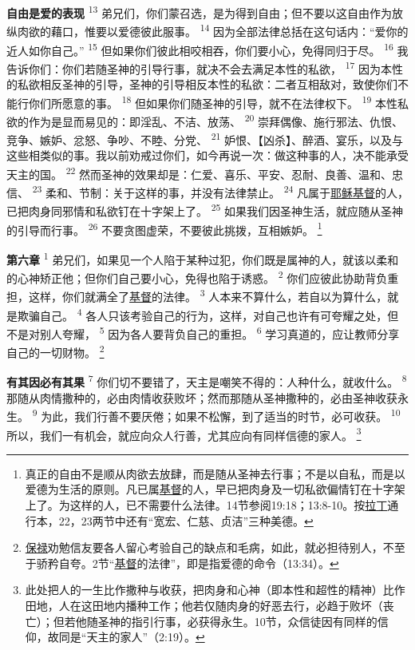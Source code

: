 \textbf{自由是爱的表现\quad}
\textsuperscript{13}
弟兄们，你们蒙召选，是为得到自由；但不要以这自由作为放纵肉欲的藉口，惟要以爱德彼此服事。
\textsuperscript{14}
因为全部法律总括在这句话内：“爱你的近人如你自己。”
\textsuperscript{15}
但如果你们彼此相咬相吞，你们要小心，免得同归于尽。
\textsuperscript{16}
我告诉你们：你们若随圣神的引导行事，就决不会去满足本性的私欲，
\textsuperscript{17}
因为本性的私欲相反圣神的引导，圣神的引导相反本性的私欲：二者互相敌对，致使你们不能行你们所愿意的事。
\textsuperscript{18}
但如果你们随圣神的引导，就不在法律权下。
\textsuperscript{19}
本性私欲的作为是显而易见的：即淫乱、不洁、放荡、
\textsuperscript{20}
崇拜偶像、施行邪法、仇恨、竞争、嫉妒、忿怒、争吵、不睦、分党、
\textsuperscript{21}
妒恨、【凶杀】、醉酒、宴乐，以及与这些相类似的事。我以前劝戒过你们，如今再说一次：做这种事的人，决不能承受天主的国。
\textsuperscript{22}
然而圣神的效果却是：仁爱、喜乐、平安、忍耐、良善、温和、忠信、
\textsuperscript{23}
柔和、节制：关于这样的事，并没有法律禁止。
\textsuperscript{24}
凡属于\uline{耶稣}\uline{基督}的人，已把肉身同邪情和私欲钉在十字架上了。
\textsuperscript{25}
如果我们因圣神生活，就应随从圣神的引导而行事。
\textsuperscript{26}
不要贪图虚荣，不要彼此挑拨，互相嫉妒。
\footnote{真正的自由不是顺从肉欲去放肆，而是随从圣神去行事；不是以自私，而是以爱德为生活的原则。凡已属\uline{基督}的人，早已把肉身及一切私欲偏情钉在十字架上了。为这样的人，已不需要什么法律。14节参阅19:18；13:8-10。按\uline{拉丁}通行本，22，23两节中还有“宽宏、仁慈、贞洁”三种美德。}

\textbf{第六章\quad}
\textsuperscript{1}
弟兄们，如果见一个人陷于某种过犯，你们既是属神的人，就该以柔和的心神矫正他；但你们自己要小心，免得也陷于诱惑。
\textsuperscript{2}
你们应彼此协助背负重担，这样，你们就满全了\uline{基督}的法律。
\textsuperscript{3}
人本来不算什么，若自以为算什么，就是欺骗自己。
\textsuperscript{4}
各人只该考验自己的行为，这样，对自己也许有可夸耀之处，但不是对别人夸耀，
\textsuperscript{5}
因为各人要背负自己的重担。
\textsuperscript{6}
学习真道的，应让教师分享自己的一切财物。
\footnote{\uline{保禄}劝勉信友要各人留心考验自己的缺点和毛病，如此，就必担待别人，不至于骄矜自夸。2节“\uline{基督}的法律”，即是指爱德的命令（13:34）。}

\textbf{有其因必有其果\quad}
\textsuperscript{7}
你们切不要错了，天主是嘲笑不得的：人种什么，就收什么。
\textsuperscript{8}
那随从肉情撒种的，必由肉情收获败坏；然而那随从圣神撒种的，必由圣神收获永生。
\textsuperscript{9}
为此，我们行善不要厌倦；如果不松懈，到了适当的时节，必可收获。
\textsuperscript{10}
所以，我们一有机会，就应向众人行善，尤其应向有同样信德的家人。
\footnote{此处把人的一生比作撒种与收获，把肉身和心神（即本性和超性的精神）比作田地，人在这田地内播种工作；他若仅随肉身的好恶去行，必趋于败坏（丧亡）；但若他随圣神的指引行事，必获得永生。10节，众信徒因有同样的信仰，故同是“天主的家人”（2:19）。}

